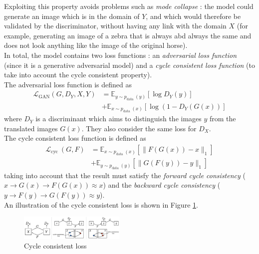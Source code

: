 \documentclass[twocolumn,superscriptaddress,aps, floatfix]{revtex4-1}
\begin{document}
    Exploiting this property avoids problems such as \emph{mode collapse} : the model could generate an image which is in the domain of $Y$, and which would therefore be validated by the discriminator, without having any link with the domain $X$ (for example, generating an image of a zebra that is always abd always the same and does not look anything like the image of the original horse).\\
    
    In total, the model contains two loss functions : an \emph{adversarial loss function} (since it is a generative adversarial model) and a \emph{cycle consistent loss function} (to take into account the cycle consistent property).\\
    
    The adversarial loss function is defined as
    \begin{align}
        \mathcal{L}_{\mathrm{GAN}}\left(G, D_{Y}, X, Y\right)&=\mathbb{E}_{y \sim p_{\text {data }}(y)}\left[\log D_{Y}(y)\right]\nonumber\\
        &+\mathbb{E}_{x \sim p_{\text {data }}(x)}\left[\log \left(1-D_{Y}(G(x))\right]\right.
    \end{align}
    where $D_Y$ is a discriminant which aims to distinguish the images ${y}$ from the translated images ${G(x)}$. They also consider the same loss for $D_X$.\\
    
    The cycle consistent loss function is defined as
    \begin{align}
        \mathcal{L}_{\text {cyc }}(G, F) &=\mathbb{E}_{x \sim p_{\text {data }}(x)}\left[\|F(G(x))-x\|_{1}\right]\nonumber\\
        &+\mathbb{E}_{y \sim p_{\text {data }}(y)}\left[\|G(F(y))-y\|_{1}\right]
    \end{align}
    taking into account that the result must satisfy the \emph{forward cycle consistency} ($x\rightarrow G(x)\rightarrow F(G(x))\approx x$) and the \emph{backward cycle consistency} ($y\rightarrow F(y)\rightarrow G(F(y))\approx y$).\\
    
    An illustration of the cycle consistent loss is shown in Figure \ref{fig:methods.cyclegan.cycleconsistentloss}.\\
    
    \begin{figure}[ht]
        \centering
        \includegraphics[width=0.45\textwidth]{resources/png/cycle-consistent-loss.png}
        \caption{Cycle consistent loss \cite{DBLP:journals/corr/ZhuPIE17}}
        \label{fig:methods.cyclegan.cycleconsistentloss}
    \end{figure}
    
\end{document}
